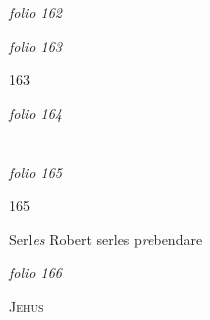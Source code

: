 \documentclass[12pt, a4paper]{book}
\begin{document}
\dotfill
					

\textit{folio 162}


         \vspace{4cm}
         
\dotfill
					

\textit{folio 163}


\begin{flushright}{\color{Mahogany}163}\end{flushright}

\dotfill
					

\textit{folio 164}


         \vspace{4cm}
         
\dotfill
					  \section*{}  \subsection*{}

\textit{folio 165}



\begin{flushright}{\color{Mahogany}165}\end{flushright}
            		
            			
				\marginpar[\vspace{0.5cm}{\textcolor{Gray}{B}}]{}
			
            			
		\ifthenelse{\isodd{\thepage}}
		{\reversemarginpar}
		{\normalmarginpar}
		Serl\textit{es} Robert serles p\textit{re}bendare

\dotfill
					

\textit{folio 166}


	
				\begin{center} \begin{large} {\scshape Jehus} \end{large} \end{center}
			
	
		
\end{document}
